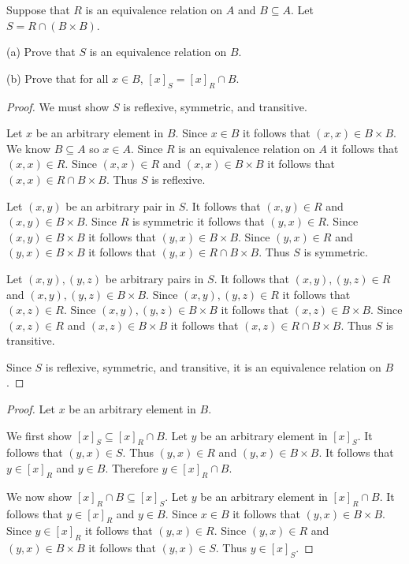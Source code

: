 \begin{tcolorbox}[title=Problem 14, breakable]
    Suppose that $R$ is an equivalence relation on $A$
    and $B \subseteq A$. Let $S = R \cap (B \times B)$.

    (a) Prove that $S$ is an equivalence relation on $B$.

    (b) Prove that for all $x \in B$, $[x]_S = [x]_R \cap B$.
\end{tcolorbox}

\begin{proof}
    We must show $S$ is reflexive, symmetric, and transitive.

    Let $x$ be an arbitrary element in $B$.
    Since $x \in B$ it follows that $(x, x) \in B \times B$.
    We know $B \subseteq A$ so $x \in A$.
    Since $R$ is an equivalence relation on $A$ it follows that $(x, x) \in R$.
    Since $(x, x) \in R$ and $(x, x) \in B \times B$ 
        it follows that $(x, x) \in R \cap B \times B$.
    Thus $S$ is reflexive.

    Let $(x, y)$ be an arbitrary pair in $S$.
    It follows that $(x, y) \in R$ and $(x, y) \in B \times B$.
    Since $R$ is symmetric it follows that $(y, x) \in R$.
    Since $(x, y) \in B \times B$ it follows that $(y, x) \in B \times B$.
    Since $(y, x) \in R$ and $(y, x) \in B \times B$ 
        it follows that $(y, x) \in R \cap B \times B$.
    Thus $S$ is symmetric.

    Let $(x, y), (y, z)$ be arbitrary pairs in $S$.
    It follows that $(x, y), (y, z) \in R$ and $(x, y), (y, z) \in B \times B$.
    Since $(x, y), (y, z) \in R$ it follows that $(x, z) \in R$.
    Since $(x, y), (y, z) \in B \times B$ it follows that $(x, z) \in B \times B$.
    Since $(x, z) \in R$ and $(x, z) \in B \times B$ 
        it follows that $(x, z) \in R \cap B \times B$.
    Thus $S$ is transitive.

    Since $S$ is reflexive, symmetric, and transitive, it 
        is an equivalence relation on $B$.
\end{proof}

\begin{proof}
    Let $x$ be an arbitrary element in $B$.

    We first show $[x]_S \subseteq [x]_R \cap B$.
    Let $y$ be an arbitrary element in $[x]_S$.
    It follows that $(y, x) \in S$.
    Thus $(y, x) \in R$ and $(y, x) \in B \times B$.
    It follows that $y \in [x]_R$ and $y \in B$.
    Therefore $y \in [x]_R \cap B$.

    We now show $[x]_R \cap B \subseteq [x]_S$.
    Let $y$ be an arbitrary element in $[x]_R \cap B$.
    It follows that $y \in [x]_R$ and $y \in B$.
    Since $x \in B$ it follows that $(y, x) \in B \times B$.
    Since $y \in [x]_R$ it follows that $(y, x) \in R$.
    Since $(y, x) \in R$ and $(y, x) \in B \times B$
        it follows that $(y, x) \in S$.
    Thus $y \in [x]_S$.
\end{proof}

